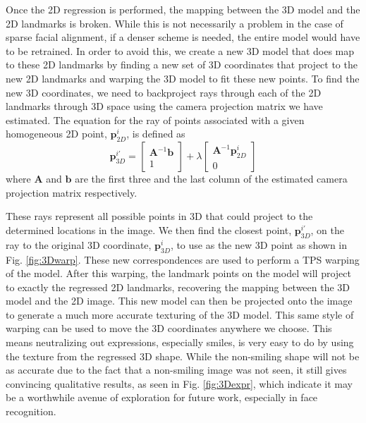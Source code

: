 \documentclass[10pt,twocolumn,letterpaper]{article}
\begin{document}
Once the 2D regression is performed, the mapping between the 3D model and the 2D landmarks is broken. While this is not necessarily a problem in the case of sparse facial alignment, if a denser scheme is needed, the entire model would have to be retrained. In order to avoid this, we create a new 3D model that does map to these 2D landmarks by finding a new set of 3D coordinates that project to the new 2D landmarks and warping the 3D model to fit these new points. To find the new 3D coordinates, we need to backproject rays through each of the 2D landmarks through 3D space using the camera projection matrix we have estimated. The equation for the ray of points associated with a given homogeneous 2D point, $\mathbf{p}^i_{2D}$, is defined as
\begin{equation}
\mathbf{p}^{i\prime}_{3D}=\begin{bmatrix}\mathbf{A}^{-1}\mathbf{b}\\1\end{bmatrix}+\lambda \begin{bmatrix}\mathbf{A}^{-1}\mathbf{p}^i_{2D}\\ 0\end{bmatrix}
\end{equation}
where $\mathbf{A}$ and $\mathbf{b}$ are the first three and the last column of the estimated camera projection matrix respectively.

These rays represent all possible points in 3D that could project to the determined locations in the image. We then find the closest point, $\mathbf{p}^{i\prime}_{3D}$, on the ray to the original 3D coordinate, $\mathbf{p}^{i}_{3D}$, to use as the new 3D point as shown in Fig. \ref{fig:3Dwarp}. These new correspondences are used to perform a TPS warping of the model. After this warping, the landmark points on the model will project to exactly the regressed 2D landmarks, recovering the mapping between the 3D model and the 2D image. This new model can then be projected onto the image to generate a much more accurate texturing of the 3D model. This same style of warping can be used to move the 3D coordinates anywhere we choose. This means neutralizing out expressions, especially smiles, is very easy to do by using the texture from the regressed 3D shape. While the non-smiling shape will not be as accurate due to the fact that a non-smiling image was not seen, it still gives convincing qualitative results, as seen in Fig. \ref{fig:3Dexpr}, which indicate it may be a worthwhile avenue of exploration for future work, especially in face recognition.
\end{document}
